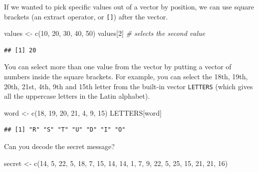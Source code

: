 \documentclass[
  oneside]{book}
\newenvironment{Shaded}{\begin{snugshade}}{\end{snugshade}}
\newcommand{\CommentTok}[1]{\textcolor[rgb]{0.56,0.35,0.01}{\textit{#1}}}
\newcommand{\DecValTok}[1]{\textcolor[rgb]{0.00,0.00,0.81}{#1}}
\newcommand{\FunctionTok}[1]{\textcolor[rgb]{0.00,0.00,0.00}{#1}}
\newcommand{\NormalTok}[1]{#1}
\newcommand{\OtherTok}[1]{\textcolor[rgb]{0.56,0.35,0.01}{#1}}
\begin{document}
If we wanted to pick specific values out of a vector by position, we can use square brackets (an extract operator, or \texttt{{[}{]}}) after the vector.

\begin{Shaded}
\begin{Highlighting}[]
\NormalTok{values }\OtherTok{\textless{}{-}} \FunctionTok{c}\NormalTok{(}\DecValTok{10}\NormalTok{, }\DecValTok{20}\NormalTok{, }\DecValTok{30}\NormalTok{, }\DecValTok{40}\NormalTok{, }\DecValTok{50}\NormalTok{)}
\NormalTok{values[}\DecValTok{2}\NormalTok{] }\CommentTok{\# selects the second value}
\end{Highlighting}
\end{Shaded}

\begin{verbatim}
## [1] 20
\end{verbatim}

You can select more than one value from the vector by putting a vector of numbers inside the square brackets. For example, you can select the 18th, 19th, 20th, 21st, 4th, 9th and 15th letter from the built-in vector \texttt{LETTERS} (which gives all the uppercase letters in the Latin alphabet).

\begin{Shaded}
\begin{Highlighting}[]
\NormalTok{word }\OtherTok{\textless{}{-}} \FunctionTok{c}\NormalTok{(}\DecValTok{18}\NormalTok{, }\DecValTok{19}\NormalTok{, }\DecValTok{20}\NormalTok{, }\DecValTok{21}\NormalTok{, }\DecValTok{4}\NormalTok{, }\DecValTok{9}\NormalTok{, }\DecValTok{15}\NormalTok{)}
\NormalTok{LETTERS[word]}
\end{Highlighting}
\end{Shaded}

\begin{verbatim}
## [1] "R" "S" "T" "U" "D" "I" "O"
\end{verbatim}

\begin{try}

Can you decode the secret message?

\begin{Shaded}
\begin{Highlighting}[]
\NormalTok{secret }\OtherTok{\textless{}{-}} \FunctionTok{c}\NormalTok{(}\DecValTok{14}\NormalTok{, }\DecValTok{5}\NormalTok{, }\DecValTok{22}\NormalTok{, }\DecValTok{5}\NormalTok{, }\DecValTok{18}\NormalTok{, }\DecValTok{7}\NormalTok{, }\DecValTok{15}\NormalTok{, }\DecValTok{14}\NormalTok{, }\DecValTok{14}\NormalTok{, }\DecValTok{1}\NormalTok{, }\DecValTok{7}\NormalTok{, }\DecValTok{9}\NormalTok{, }\DecValTok{22}\NormalTok{, }\DecValTok{5}\NormalTok{, }\DecValTok{25}\NormalTok{, }\DecValTok{15}\NormalTok{, }\DecValTok{21}\NormalTok{, }\DecValTok{21}\NormalTok{, }\DecValTok{16}\NormalTok{)}
\end{Highlighting}
\end{Shaded}

\end{try}
\end{document}
